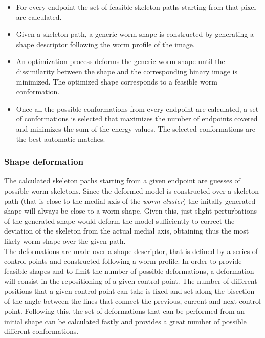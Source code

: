 \begin{itemize}
\item For every endpoint the set of feasible skeleton paths starting from that pixel
  are calculated.
\item Given a skeleton path, a generic worm shape is constructed by generating a shape
descriptor following the worm profile of the image.
\item An optimization process deforms the generic worm shape until the dissimilarity
between the shape and the corresponding binary image is minimized. The optimized
shape corresponds to a feasible worm conformation.
\item Once all the possible conformations from every endpoint are calculated, a set of
conformations is selected that maximizes the number of endpoints covered and minimizes
the sum of the energy values. The selected conformations are the best automatic matches.
\end{itemize}

\subsubsection*{Shape deformation}

The calculated skeleton paths starting from a given endpoint are guesses of possible
worm skeletons. Since the deformed model is constructed over a skeleton path 
(that is close to the medial axis of the \emph{worm cluster}) the initally generated 
shape will always be close to a worm shape. Given this, just slight perturbations of
the generated shape would deform the model sufficiently to correct the deviation of the
skeleton from the actual medial axis, obtaining thus the most likely worm shape
over the given path.\\

The deformations are made over a shape descriptor, that is defined by a series of 
control points and constructed following a worm profile. In order to provide feasible
shapes and to limit the number of possible deformations, a deformation will consist
in the repositioning of a given control point. The number of different positions that a 
given control point can take is fixed and set along the bisection of the angle between
the lines that connect the previous, current and next control point. 
Following this, the set of deformations that can be performed from an initial shape 
can be calculated fastly and provides a great number of possible different conformations.\\

